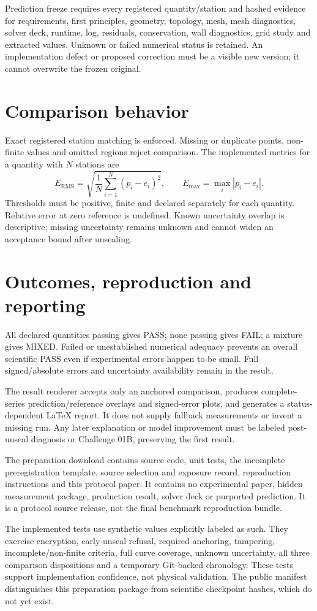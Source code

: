 \documentclass[10pt]{article}
\begin{document}
Prediction freeze requires every registered quantity/station and hashed evidence for requirements, first principles, geometry, topology, mesh, mesh diagnostics, solver deck, runtime, log, residuals, conservation, wall diagnostics, grid study and extracted values. Unknown or failed numerical status is retained. An implementation defect or proposed correction must be a visible new version; it cannot overwrite the frozen original.
\section{Comparison behavior}
Exact registered station matching is enforced. Missing or duplicate points, non-finite values and omitted regions reject comparison. The implemented metrics for a quantity with $N$ stations are
\[
 E_{\mathrm{RMS}}=\sqrt{\frac{1}{N}\sum_{i=1}^{N}(p_i-e_i)^2},\qquad
 E_{\max}=\max_i|p_i-e_i|.
\]
Thresholds must be positive, finite and declared separately for each quantity. Relative error at zero reference is undefined. Known uncertainty overlap is descriptive; missing uncertainty remains unknown and cannot widen an acceptance bound after unsealing.
\clearpage
\section{Outcomes, reproduction and reporting}
All declared quantities passing gives PASS; none passing gives FAIL; a mixture gives MIXED. Failed or unestablished numerical adequacy prevents an overall scientific PASS even if experimental errors happen to be small. Full signed/absolute errors and uncertainty availability remain in the result.

The result renderer accepts only an anchored comparison, produces complete-series prediction/reference overlays and signed-error plots, and generates a status-dependent LaTeX report. It does not supply fallback measurements or invent a missing run. Any later explanation or model improvement must be labeled post-unseal diagnosis or Challenge 01B, preserving the first result.

The preparation download contains source code, unit tests, the incomplete preregistration template, source selection and exposure record, reproduction instructions and this protocol paper. It contains no experimental paper, hidden measurement package, production result, solver deck or purported prediction. It is a protocol source release, not the final benchmark reproduction bundle.

The implemented tests use synthetic values explicitly labeled as such. They exercise encryption, early-unseal refusal, required anchoring, tampering, incomplete/non-finite criteria, full curve coverage, unknown uncertainty, all three comparison dispositions and a temporary Git-backed chronology. These tests support implementation confidence, not physical validation. The public manifest distinguishes this preparation package from scientific checkpoint hashes, which do not yet exist.
\end{document}

